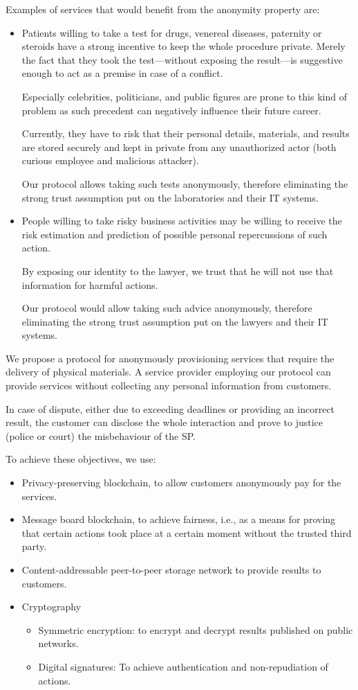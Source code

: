 \documentclass{ieeeaccess}
\begin{document}
Examples of services that would benefit from the anonymity property are:
\begin{itemize}
    \item Patients willing to take a test for drugs, venereal diseases, paternity or steroids have a strong incentive to keep the whole procedure private. Merely the fact that they took the test—without exposing the result—is suggestive enough to act as a premise in case of a conflict.

Especially celebrities, politicians, and public figures are prone to this kind of problem as such precedent can negatively influence their future career.

Currently, they have to risk that their personal details, materials, and results are stored securely and kept in private from any unauthorized actor (both curious employee and malicious attacker).

Our protocol allows taking such tests anonymously, therefore eliminating the strong trust assumption put on the laboratories and their IT
systems.
\item People willing to take risky business activities may be willing to receive the risk estimation and prediction of possible personal repercussions of such action.

By exposing our identity to the lawyer, we trust that he will not use that
information for harmful actions.

Our protocol would allow taking such advice anonymously, therefore eliminating the strong trust assumption put on the lawyers and their IT systems.
\end{itemize}

We propose a protocol for anonymously provisioning services that require the delivery of physical materials. A service provider employing our protocol can provide services without collecting any personal information from customers.

In case of dispute, either due to exceeding deadlines or providing an  incorrect result, the customer can disclose the whole interaction and
prove to justice (police or court) the misbehaviour of the SP.

To achieve these objectives, we use:
\begin{itemize}
    \item Privacy-preserving blockchain, to allow customers anonymously pay for the services.
    \item Message board blockchain, to achieve fairness, i.e., as a means for proving that certain actions took place at a certain moment without the trusted third party.
    \item Content-addressable peer-to-peer storage network to provide results to customers. 
    \item Cryptography
    \begin{itemize}
        \item Symmetric encryption: to encrypt and decrypt results published on public networks.
        \item Digital signatures: To achieve authentication and non-repudiation of actions. 
    \end{itemize}
    
\end{itemize}
\end{document}
